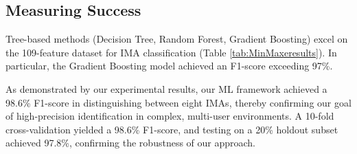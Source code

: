 \documentclass[conference]{IEEEtran}
\begin{document}
\subsection{Measuring Success}
Tree-based methods (Decision Tree, Random Forest, Gradient Boosting) excel on the 109-feature dataset for IMA classification (Table \ref{tab:MinMaxeresults}). In particular, the Gradient Boosting model achieved an F1-score exceeding 97\%.

As demonstrated by our experimental results, our ML framework achieved a 98.6\% F1-score in distinguishing between eight IMAs, thereby confirming our goal of high-precision identification in complex, multi-user environments. A 10-fold cross-validation yielded a 98.6\% F1-score, and testing on a 20\% holdout subset achieved 97.8\%, confirming the robustness of our approach.
\end{document}
